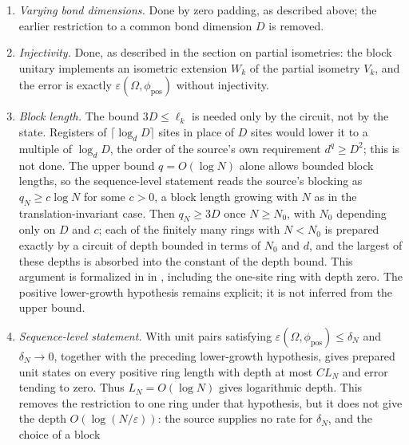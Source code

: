 \documentclass{article}
\begin{document}
\begin{enumerate}
    \item \emph{Varying bond dimensions.} Done by zero padding, as described
          above; the earlier restriction to a common bond dimension $D$ is
          removed.
    \item \emph{Injectivity.} Done, as described in the section on partial
          isometries: the block unitary implements an isometric extension
          $W_k$ of the partial isometry $V_k$, and the error is exactly
          $\varepsilon(\Omega,\phi_{\mathrm{pos}})$ without injectivity.
    \item \emph{Block length.} The bound $3D\le\ell_k$ is needed only by
          the circuit, not by the state. Registers of
          $\lceil\log_dD\rceil$ sites in place of $D$ sites would lower it to
          a multiple of $\log_dD$, the order of the source's own requirement
          $d^q\ge D^2$; this is not done. The upper bound $q=O(\log N)$ alone
          allows bounded block lengths, so the sequence-level statement reads
          the source's blocking as $q_N\ge c\log N$ for some $c>0$, a block
          length growing with $N$ as in the translation-invariant case. Then
          $q_N\ge3D$ once $N\ge N_0$, with $N_0$ depending only on $D$ and
          $c$; each of the finitely many rings with $N<N_0$ is prepared exactly
          by a circuit of depth bounded in terms of $N_0$ and $d$, and the
          largest of these depths is absorbed into the constant of the depth
          bound. This argument is formalized in
          in , including
          the one-site ring with depth zero. The positive lower-growth
          hypothesis remains explicit; it is not inferred from the upper bound.
    \item \emph{Sequence-level statement.} With unit pairs satisfying
          $\varepsilon(\Omega,\phi_{\mathrm{pos}})\le\delta_N$ and
          $\delta_N\to0$, together with the preceding lower-growth hypothesis,
          gives prepared unit states on every positive ring length with depth
          at most $CL_N$ and error tending to zero. Thus $L_N=O(\log N)$ gives
          logarithmic depth. This removes the restriction to one ring under
          that hypothesis, but it does not give the depth $O(\log(N/\varepsilon))$: the
          source supplies no rate for $\delta_N$, and the choice of a block

\end{enumerate}
\end{document}
